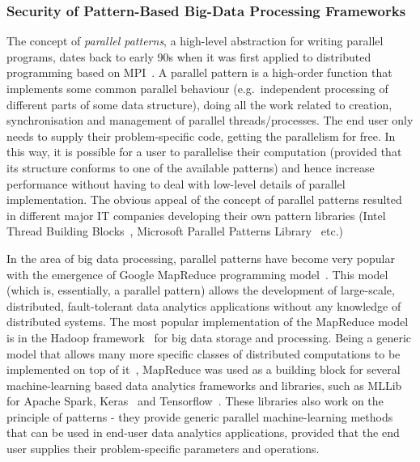 \documentclass[a4paper,11pt]{article}
\begin{document}
\subsubsection{Security of Pattern-Based Big-Data Processing Frameworks}
\label{sect:patterns}

The concept of \emph{parallel patterns}, a high-level abstraction for writing parallel programs, dates back to early 90s when it was first applied to distributed programming based on MPI~\cite{cole89skeletons}. A parallel pattern is a high-order function that implements some common parallel behaviour (e.g.~independent processing of different parts of some data structure), doing all the work related to creation, synchronisation and management of parallel threads/processes. The end user only needs to supply their problem-specific code, getting the parallelism for free. In this way, it is possible for a user to parallelise their computation (provided that its structure conforms to one of the available patterns) and hence increase performance without having to deal with low-level details of parallel implementation. The obvious appeal of the concept of parallel patterns resulted in different major IT companies developing their own pattern libraries (Intel Thread Building Blocks~\cite{tbb}, Microsoft Parallel Patterns Library~\cite{ppl} etc.)


In the area of big data processing, parallel patterns have become very popular with the emergence of Google MapReduce programming model~\cite{mapreduce}. This model (which is, essentially, a parallel pattern) allows the development of large-scale, distributed, fault-tolerant data analytics applications without any knowledge of distributed systems. The most popular implementation of the MapReduce model is in the Hadoop framework~\cite{hadoop} for big data storage and processing. Being a generic model that allows many more specific classes of distributed computations to be implemented on top of it~\cite{bigdatabook}, MapReduce was used as a building block for several machine-learning based data analytics frameworks and libraries, such as MLLib~\cite{mllib} for Apache Spark, Keras~\cite{keras} and Tensorflow~\cite{tensorflow}. These libraries also work on the principle of patterns - they provide generic parallel machine-learning methods that can be used in end-user data analytics applications, provided that the end user supplies their problem-specific parameters and operations.
\end{document}
